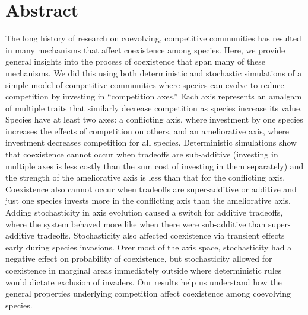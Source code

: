 \section*{Abstract}




The long history of research on coevolving, competitive communities has resulted in 
many mechanisms that affect coexistence among species.
Here, we provide general insights into the process of coexistence that span
many of these mechanisms.
We did this using both deterministic and stochastic simulations of a
simple model of competitive communities where species can evolve to reduce 
competition by investing in ``competition axes.''
Each axis represents an amalgam of multiple traits that similarly decrease
competition as species increase its value.
Species have at least two axes:
a conflicting axis, where investment by one species increases the effects of
competition on others, and 
an ameliorative axis, where investment decreases competition for all species.
Deterministic simulations show that coexistence cannot occur when tradeoffs are 
sub-additive (investing in multiple axes is less costly than the sum cost of 
investing in them separately) and the strength of the
ameliorative axis is less than that for the conflicting axis.
Coexistence also cannot occur when tradeoffs are 
super-additive or additive and just one species invests more in the conflicting axis
than the ameliorative axis.
Adding stochasticity in axis evolution caused a switch for additive tradeoffs, 
where the system behaved more like when there were sub-additive than super-additive 
tradeoffs.
Stochasticity also affected coexistence via transient effects early during
species invasions.
Over most of the axis space, stochasticity had a negative effect
on probability of coexistence, but stochasticity allowed for coexistence
in marginal areas immediately outside where deterministic rules
would dictate exclusion of invaders.
Our results help us understand how the general properties underlying
competition affect coexistence among coevolving species.



